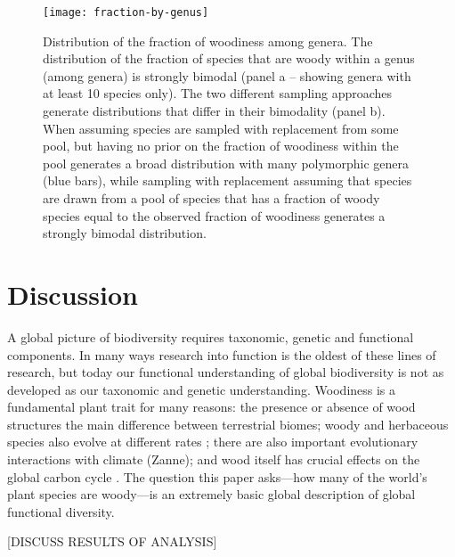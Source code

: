 \documentclass[12pt]{article}
\begin{document}
\begin{figure}[p]
  \centering
  \texttt{[image: fraction-by-genus]}
  \caption{Distribution of the fraction of woodiness among genera.
    The distribution of the fraction of species that are woody within
    a genus (among genera) is strongly bimodal (panel a -- showing
    genera with at least 10 species only).
    The two different sampling approaches generate distributions that
    differ in their bimodality (panel b).  When assuming species are
    sampled with replacement from some pool, but having no prior on
    the fraction of woodiness within the pool generates a broad
    distribution with many polymorphic genera (blue bars), while
    sampling with replacement assuming that species are drawn from a
    pool of species that has a fraction of woody species equal to the
    observed fraction of woodiness generates a strongly bimodal
    distribution.}
  \label{fig:distribution-genera}
\end{figure}




\section{Discussion}

A global picture of biodiversity requires taxonomic, genetic and functional components.  In many ways research into function is the oldest of these lines of research, but today our functional understanding of global biodiversity is not as developed as our taxonomic and genetic understanding. Woodiness is a fundamental plant trait for many reasons: the presence or absence of wood  structures the main difference between terrestrial biomes; woody and herbaceous species also evolve at different rates \citep{SmithDonoghue};  there are also important evolutionary interactions with climate (Zanne); and wood itself has crucial effects on the global carbon cycle \citep{Cornwellwood}.  The question this paper asks---how many of the world's plant species are woody---is an extremely basic global description of global functional diversity.

[DISCUSS RESULTS OF ANALYSIS]
\end{document}
